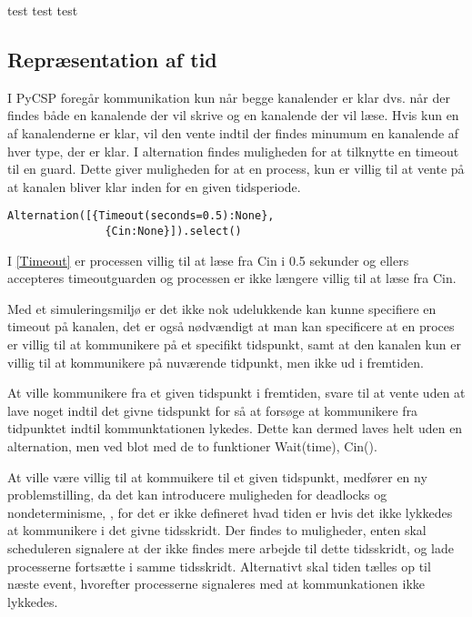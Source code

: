 test
test
test
\subsection{Repræsentation af tid}
I PyCSP foregår kommunikation kun når begge kanalender er klar dvs.
når der findes både en kanalende der vil skrive og en kanalende der vil læse. 
Hvis kun en af kanalenderne er klar, vil den vente indtil
der findes minumum en kanalende af hver type, der er klar. I alternation 
findes muligheden for at tilknytte en timeout til en guard. Dette
giver muligheden for at en process, kun er villig til at vente på at kanalen 
bliver klar inden for en given tidsperiode. 
\begin{lstlisting}[float=hbtp, label=Timeout,
  caption=Timeout i Alternation (fra dokumentationen til PyCSP)]
  Alternation([{Timeout(seconds=0.5):None},
               {Cin:None}]).select()
\end{lstlisting} 

I \autoref{Timeout} er processen villig til at læse fra Cin i 0.5 sekunder og ellers accepteres timeoutguarden og processen er ikke længere villig til at læse fra Cin.

Med et simuleringsmiljø er det ikke nok udelukkende kan kunne specifiere en 
timeout på kanalen, det er også nødvændigt at man kan specificere at en proces 
er villig til at kommunikere på et specifikt tidspunkt, samt at den kanalen 
kun er villig til at kommunikere på nuværende tidpunkt, men ikke ud 
i fremtiden. 

At ville kommunikere fra et given tidspunkt i fremtiden,  svare til at vente 
uden at lave noget indtil det givne tidspunkt for så at forsøge at kommunikere 
fra tidpunktet indtil kommunktationen lykedes. Dette kan dermed laves helt 
uden en alternation, men ved blot med de to funktioner Wait(time), Cin(). 

At ville være villig til at kommuikere til et given tidspunkt, medfører en ny 
problemstilling, da det kan introducere muligheden for deadlocks og 
nondeterminisme, , for det er ikke defineret hvad 
tiden er hvis det ikke lykkedes at kommunikere i det givne tidsskridt. Der 
findes to muligheder, enten skal scheduleren signalere at der ikke findes mere 
arbejde til dette tidsskridt, og lade processerne fortsætte i samme 
tidsskridt. Alternativt skal tiden tælles op til næste event, hvorefter 
processerne signaleres med at kommunkationen ikke lykkedes. 

